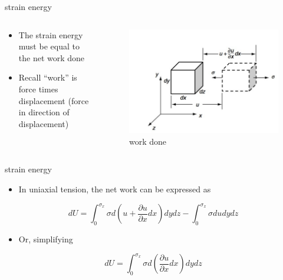 \documentclass[
  letterpaper,
  ignorenonframetext,
  aspectratio=43,
  handout,
  12pt]{beamer}
\providecommand{\tightlist}{%
  \setlength{\itemsep}{0pt}\setlength{\parskip}{0pt}}
\providecommand{\tightlist}{%
\setlength{\itemsep}{0pt}\setlength{\parskip}{0pt}}
\let\Oldincludegraphics\includegraphics
\renewcommand{\includegraphics}[2][]{\Oldincludegraphics[width=\textwidth,height=0.7\textheight,keepaspectratio]{#2}}
\begin{document}
\begin{frame}{strain energy}
\protect\hypertarget{strain-energy-2}{}
\begin{columns}[T]
\begin{column}{0.5\textwidth}
\begin{itemize}
\tightlist
\item
  The strain energy must be equal to the net work done
\item
  Recall ``work'' is force times displacement (force in direction of
  displacement)
\end{itemize}
\end{column}

\begin{column}{0.5\textwidth}
\begin{figure}
\centering
\includegraphics{../images/work.PNG}
\caption{work done}
\end{figure}
\end{column}
\end{columns}
\end{frame}

\begin{frame}{strain energy}
\protect\hypertarget{strain-energy-3}{}
\begin{itemize}
\tightlist
\item
  In uniaxial tension, the net work can be expressed as
\end{itemize}

\[dU = \int_0^{\sigma_x} \sigma d\left(u + \frac{\partial u}{\partial x}dx\right)dydz - \int_0^{\sigma_x} \sigma du dy dz\]

\begin{itemize}
\tightlist
\item
  Or, simplifying
\end{itemize}

\[dU = \int_0^{\sigma_x} \sigma d\left(\frac{\partial u}{\partial x}dx\right)dydz\]
\end{frame}
\end{document}
